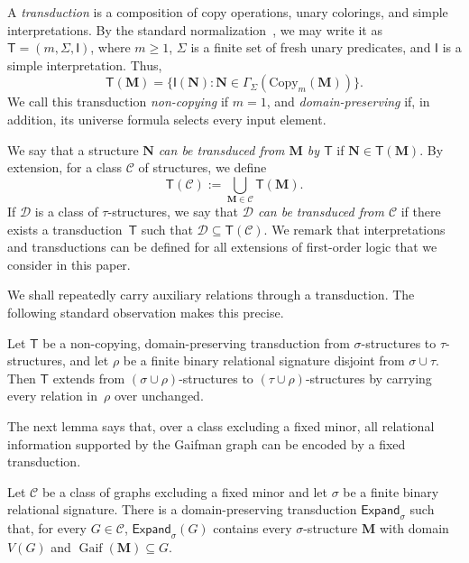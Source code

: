 \documentclass[1p,number,11pt]{elsarticle}
\newcommand{\Gaif}{\operatorname{Gaif}}
\theoremstyle{plain}
\newcommand{\Cc}{\mathscr{C}}
\newcommand{\Dd}{\mathscr{D}}
\renewcommand{\geq}{\geqslant}
\newcommand{\is}{\mathrel{:=}}
\begin{document}
A \emph{transduction} is a composition of copy operations, unary colorings, and simple interpretations. By the standard normalization~\cite{gajarsky2020first}, we may write it as $\mathsf T=(m,\Sigma,\mathsf I)$, where $m\geq1$, $\Sigma$ is a finite set of fresh unary predicates, and $\mathsf I$ is a simple interpretation. Thus,
\[
 \mathsf T(\mathbf M)=\{\mathsf I(\mathbf N):\mathbf N\in\Gamma_\Sigma(\mathrm{Copy}_m(\mathbf M))\}.
\]
We call this transduction \emph{non-copying} if $m=1$, and \emph{domain-preserving} if, in addition, its universe formula selects every input element.

We say that a structure $\mathbf N$ \emph{can be transduced from $\mathbf M$ by $\mathsf{T}$} if $\mathbf N\in\mathsf T(\mathbf M)$.
By extension, for a class $\Cc$ of structures, we define
\[
\mathsf T(\Cc)\is\bigcup_{\mathbf M\in\Cc}\mathsf T(\mathbf M).
\]
If $\Dd$ is a class of $\tau$-structures, we say that \emph{$\Dd$ can be transduced from $\Cc$} if there exists a transduction~$\mathsf T$ such that
$\Dd \subseteq \mathsf T(\Cc)$.
We remark that interpretations and transductions can be defined for all extensions of first-order logic that we consider in this paper. 

\medskip

We shall repeatedly carry auxiliary relations through a transduction.  The
following standard observation makes this precise.

\begin{fact}
    \label{fact:expand}
Let $\mathsf T$ be a non-copying, domain-preserving transduction from
$\sigma$-structures to $\tau$-structures, and let $\rho$ be a finite binary
relational signature disjoint from $\sigma\cup\tau$. Then $\mathsf T$
extends from $(\sigma\cup\rho)$-structures to
$(\tau\cup\rho)$-structures by carrying every relation in~$\rho$ over
unchanged.
\end{fact}

The next lemma says that, over a class excluding a fixed minor, all relational
information supported by the Gaifman graph can be encoded by a fixed
transduction. 

\begin{lemma}
\label{lem:structure-from-gaif}
Let $\Cc$ be a class of graphs excluding a fixed minor and let $\sigma$ be a
finite binary relational signature.  There is a domain-preserving
transduction $\mathsf{Expand}_\sigma$ such that, for every $G\in\Cc$,
$\mathsf{Expand}_\sigma(G)$ contains every $\sigma$-structure $\mathbf M$
with domain~$V(G)$ and $\Gaif(\mathbf M)\subseteq G$.
\end{lemma}
\end{document}
